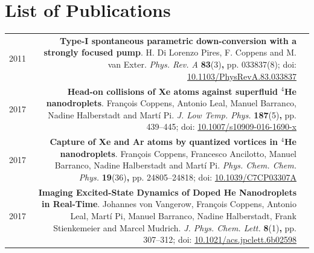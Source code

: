 \chapter*{List of Publications}
\begin{tabular}{l!{\VRule}Rc}
	2011 & \textbf{Type-I spontaneous parametric down-conversion with a strongly focused pump}. H. Di Lorenzo Pires, F. Coppens and M. van Exter. \emph{Phys. Rev. A} \textbf{83}(3)\textbf{,} pp. 033837(8); doi: \href{http://link.aps.org/doi/10.1103/PhysRevA.83.033837}{10.1103/PhysRevA.83.033837}&\vspace{20pt}\\
	2017 & \textbf{Head-on collisions of {Xe} atoms against superfluid $^4${H}e nanodroplets}. Fran\c{c}ois Coppens, Antonio Leal, Manuel Barranco, Nadine Halberstadt and Mart\'{i} Pi. \emph{J. Low Temp. Phys.} \textbf{187}(5)\textbf{,} pp. 439--445; doi: \href{https://doi.org/10.1007/s10909-016-1690-x}{10.1007/s10909-016-1690-x}&\vspace{20pt}\\
	2017 & \textbf{Capture of Xe and Ar atoms by quantized vortices in $^4$He nanodroplets}. Fran\c{c}ois Coppens, Francesco Ancilotto, Manuel Barranco, Nadine Halberstadt and Mart\'{i} Pi. \emph{Phys. Chem. Chem. Phys.} \textbf{19}(36)\textbf{,} pp. 24805--24818; doi: \href{http://dx.doi.org/10.1039/C7CP03307A}{10.1039/C7CP03307A}&\vspace{20pt}\\
	2017 & \textbf{Imaging Excited-State Dynamics of Doped He Nanodroplets in Real-Time}. Johannes von Vangerow, Fran\c{c}ois Coppens, Antonio Leal, Mart\'{i} Pi, Manuel Barranco, Nadine Halberstadt, Frank Stienkemeier and Marcel Mudrich. \emph{J. Phys. Chem. Lett.} \textbf{8}(1)\textbf{,} pp. 307--312; doi: \href{http://dx.doi.org/10.1021/acs.jpclett.6b02598}{10.1021/acs.jpclett.6b02598}&\vspace{20pt}\\

\end{tabular}
